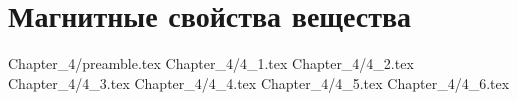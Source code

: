 \chapter{Магнитные свойства вещества}

 {Chapter_4/preamble.tex}
 {Chapter_4/4_1.tex}
 {Chapter_4/4_2.tex}
 {Chapter_4/4_3.tex}
 {Chapter_4/4_4.tex}
 {Chapter_4/4_5.tex}
 {Chapter_4/4_6.tex}